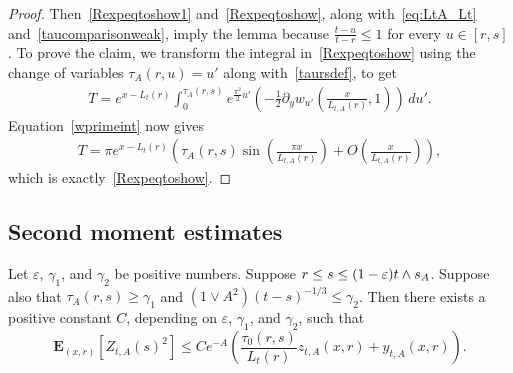 \documentclass[AHL,Unicode,longabstracts,published]{cedram}
\newcommand*\eps{\varepsilon}
\newcommand*\E{\mathbf{E}}
\newcommand{\1} {\mathds{1}}
\begin{document}
\begin{proof}
Then~\eqref{Rexpeqtoshow1} and~\eqref{Rexpeqtoshow}, along with~\eqref{eq:LtA_Lt} and~\eqref{taucomparisonweak}, imply the lemma because $\frac{t-u}{t-r} \le 1$ for every $u\in [r,s]$. To prove the claim, we transform the integral in~\eqref{Rexpeqtoshow} using the change of variables $\tau_A(r,u) = u'$ along with~\eqref{taursdef}, to get
\begin{align*}
T= e^{x-L_t(r)} \int_0^{\tau_A(r,s)} e^{\frac{\pi^2}2 u'} \left(-\frac 1 2 \partial_y w_{u'} \left(\frac{x}{L_{t,A}(r)}, 1 \right)\right)\,du'.
\end{align*}
Equation~\eqref{wprimeint} now gives
\begin{align*}
T = \pi e^{x-L_t(r)} \left(\tau_A(r,s) \sin\left(\frac{\pi x}{L_{t,A}(r)}\right) + O\left(\frac{x}{L_{t,A}(r)}\right)\right),
\end{align*}
which is exactly~\eqref{Rexpeqtoshow}.
\end{proof}

\subsection{Second moment estimates}\label{sec:second_moment_estimates}

\begin{lemm}\label{lem:Zvar}
Let $\eps$, $\gamma_1$, and $\gamma_2$ be positive numbers. Suppose $r \le s \leq (1 - \eps) t\linebreak\wedge s_A$. Suppose also that $\tau_A(r,s) \geq \gamma_1$ and $(1 \vee A^2)(t - s)^{-1/3} \leq \gamma_2$. Then there exists a positive constant $C$, depending on $\eps$, $\gamma_1$, and $\gamma_2$, such that
\[
\E_{(x,r)}\left[Z_{t,A}(s)^2\right] \leq C e^{-A} \left(\frac{\tau_0(r,s)}{L_t(r)} z_{t,A}(x,r) + y_{t,A}(x,r)\right).
\]
\end{lemm}
\end{document}
